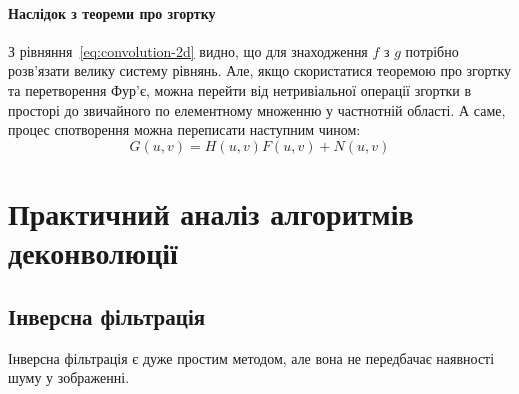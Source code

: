 \documentclass{diploma}
\begin{document}
      \paragraph{Наслідок з теореми про згортку}
        З рівняння~\eqref{eq:convolution-2d} видно, що для знаходження $f$ з $g$
        потрібно розв’язати велику систему рівнянь.
        Але, якщо скористатися теоремою про згортку та перетворення Фур’є,
        можна перейти від нетривіальної операції згортки в просторі до
        звичайного по елементному множенню у частнотній області.
        А саме, процес спотворення можна переписати наступним чином:
        \begin{equation}
          G\left( u, v \right) = H\left( u, v \right) F\left( u, v \right) +
          N\left( u, v \right)
          \label{eq:deffect-fourier}
        \end{equation}
      \clearpage
  \section{Практичний аналіз алгоритмів деконволюції}
    \subsection{Інверсна фільтрація}
      Інверсна фільтрація є дуже простим методом, але вона не передбачає
      наявності шуму у зображенні.
\end{document}
